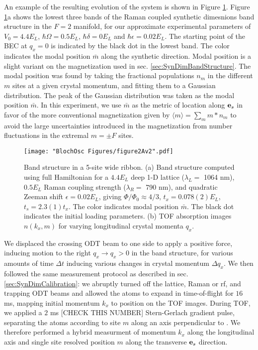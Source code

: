 An example of the resulting evolution of the system is shown in Figure \ref{fig:kickBsTOF}. Figure \ref{fig:kickBsTOF}a shows the lowest three bands of the Raman coupled synthetic dimesnions band structure in the $F=2$ manifold, for our approximate experimental parameters of $V_0 = 4.4 E_L$, $\hbar\Omega = 0.5 E_L$, $\hbar\delta = 0 E_L$ and $\hbar\epsilon = 0.02 E_L$. The starting point of the BEC at $q_x=0$ is indicated by the black dot in the lowest band. The color indicates the modal position $\bar{m}$ along the synthetic direction. Modal position is a slight variant on the magnetization used in sec. \ref{sec:SynDimBandStructure}. The modal position was found by taking the fractional populations $n_{m}$ in the different $m$ sites at a given crystal momentum, and fitting them to a Gaussian distribution. The peak of the Gaussian distribution was taken as the modal position $\bar{m}$. In this experiment, we use $\bar{m}$ as the metric of location along $\textbf{e}_s{}$ in favor of the more conventional magnetization given by $\langle m\rangle=\sum_{m}m*n_{m}$ to avoid the large uncertainties introduced in the magnetization from number fluctuations in the extremal $m=\pm F$ sites. 
\begin{figure}
\texttt{[image: "BlochOsc Figures/figure2Av2".pdf]}
\caption[Band structure in a 5-site wide ribbon]{Band structure in a 5-site wide ribbon. (a) Band structure computed using full Hamiltonian for a $4.4 E_L$ deep 1-D lattice ($\lambda_L=$ 1064 nm), $0.5 E_L$ Raman coupling strength ($\lambda_R = $ 790 nm), and quadratic Zeeman shift $\epsilon=0.02 E_L$, giving $\Phi/\Phi_0 \approx 4/3$, $t_x = 0.078(2) E_L$, $t_s=2.3(1) t_x$. The color indicates modal position $\bar{m}$. The black dot indicates the initial loading parameters.  (b) TOF absorption images $n(k_x,m)$ for varying longitudinal crystal momenta $q_x$.  }
\label{fig:kickBsTOF}
\end{figure}

We displaced the crossing ODT beam to one side to apply a positive force, inducing motion to the right $q_x\rightarrow q_x>0$ in the band structure, for various amounts of time $\Delta t$ inducing various changes in crystal momentum $\Delta q_x$. We then followed the same measurement protocol as described in sec. \ref{sec:SynDimCalibration}: we abruptly turned off the lattice, Raman or rf, and trapping ODT beams and allowed the atoms to expand in time-of-flight for $16$ ms, mapping initial momentum $k_x$ to position on the TOF images.  During TOF, we applied a $2$ ms [CHECK THIS NUMBER] Stern-Gerlach gradient pulse, separating the atoms according to site $m$ along an axis perpendicular to \ex{}. We therefore performed a hybrid measurment of momentum $k_x$ along the longitudinal \ex{} axis and single site resolved position $m$ along the transverse $\textbf{e}_s{}$ direction. 

